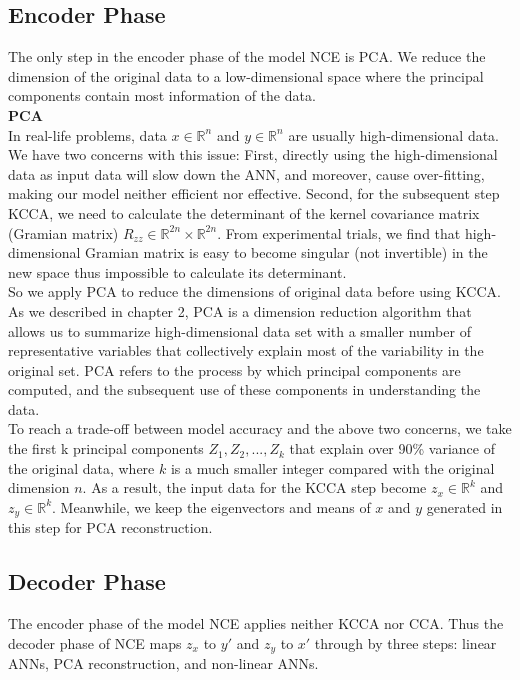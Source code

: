 \documentclass[12pt]{report} %
\begin{document}
\subsection{Encoder Phase}
The only step in the encoder phase of the model NCE is PCA. We reduce the dimension of the original data to a low-dimensional space where the principal components contain most information of the data. \\

\textbf{PCA}\\
In real-life problems, data $x\in \mathbb{R}^{n}$ and $y\in \mathbb{R}^{n}$ are usually high-dimensional data. We have two concerns with this issue: First, directly using the high-dimensional data as input data will slow down the ANN, and moreover, cause over-fitting\cite{STAT}, making our model neither efficient nor effective. Second, for the subsequent step KCCA, we need to calculate the determinant of the kernel covariance matrix (Gramian matrix) $R_{zz} \in \mathbb{R}^{2n} \times \mathbb{R}^{2n}$. From experimental trials, we find that high-dimensional Gramian matrix is easy to become singular (not invertible) in the new space thus impossible to calculate its determinant.\\
So we apply PCA to reduce the dimensions of original data before using KCCA. As we described in chapter 2, PCA is a dimension reduction algorithm that allows us to summarize high-dimensional data set with a smaller number of representative variables that collectively explain most of the variability in the original set. PCA refers to the process by which principal components are computed, and the subsequent use of these components in understanding the data.\\
To reach a trade-off between model accuracy and the above two concerns, we take the first k principal components \(Z_{1}, Z_{2},..., Z_{k}\) that explain over 90\% variance of the original data, where $k$ is a much smaller integer compared with the original dimension $n$. As a result, the input data for the KCCA step become $z_x\in \mathbb{R}^{k}$ and $z_y\in \mathbb{R}^{k}$. Meanwhile, we keep the eigenvectors and means of $x$ and $y$ generated in this step for PCA reconstruction.

\subsection{Decoder Phase}
The encoder phase of the model NCE applies neither KCCA nor CCA. Thus the decoder phase of NCE maps $z_x$ to $y'$ and $z_y$ to $x'$ through by three steps: linear ANNs, PCA reconstruction, and non-linear ANNs.\\
\end{document}
